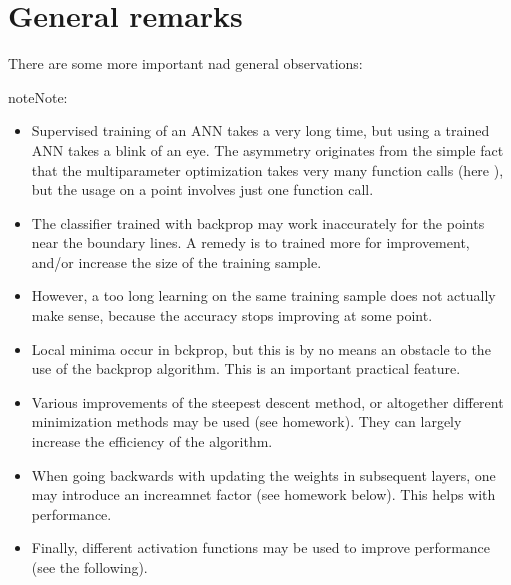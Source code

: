 \documentclass[letterpaper,10pt,english]{jupyterBook}
\begin{document}
\noindent{}


\section{General remarks}
\label{\detokenize{docs/backprop:general-remarks}}
\sphinxAtStartPar
There are some more important nad general observations:

\begin{sphinxadmonition}{note}{Note:}\begin{itemize}
\item {} 
\sphinxAtStartPar
Supervised training of an ANN takes a very long time, but using a trained ANN takes a blink of an eye. The asymmetry originates from the simple fact that the multi\sphinxhyphen{}parameter optimization takes very many function calls (here ), but the usage on a point involves just one function call.

\item {} 
\sphinxAtStartPar
The classifier trained with backprop may work inaccurately for the points near the boundary lines. A remedy is to trained more for improvement, and/or increase the
size of the training sample.

\item {} 
\sphinxAtStartPar
However, a too long learning on the same training sample does not actually make sense, because the accuracy stops improving at some point.

\item {} 
\sphinxAtStartPar
Local minima occur in bckprop, but this is by no means an obstacle to the use of the backprop algorithm. This is an important practical feature.

\item {} 
\sphinxAtStartPar
Various improvements of the steepest descent method, or altogether different minimization methods may be used (see homework). They can largely increase the efficiency of the algorithm.

\item {} 
\sphinxAtStartPar
When going backwards with updating the weights in subsequent layers, one may introduce an increamnet factor (see homework below). This helps with performance.

\item {} 
\sphinxAtStartPar
Finally, different activation functions may be used to improve performance (see the following).

\end{itemize}
\end{sphinxadmonition}
\end{document}
